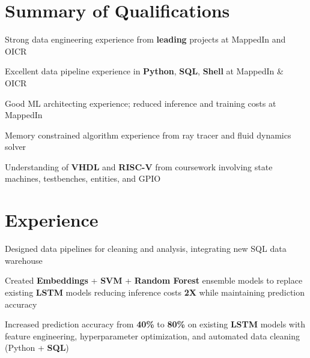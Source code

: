 \documentclass[]{chandan-cv}
\begin{document}
\hfill
\begin{minipage}[t]{0.75\textwidth}


\section{Summary of Qualifications}
\runsubsection{ }
\descript{ }
\location{ }
\vspace{\topsep} %
\begin{tightemize}
	\item Strong data engineering experience from \textbf{leading} projects at MappedIn and OICR
	\item Excellent data pipeline experience in \textbf{Python}, \textbf{SQL}, \textbf{Shell} at MappedIn \& OICR
	\item Good ML architecting experience; reduced inference and training costs at MappedIn
	\item Memory constrained algorithm experience from ray tracer and fluid dynamics solver
	\item Understanding of \textbf{VHDL} and \textbf{RISC-V} from coursework involving 
	state machines, testbenches, entities, and GPIO
\end{tightemize}
\sectionsep


\section{Experience}

\begin{tightemize}
        \item Designed data pipelines for cleaning and analysis, integrating new SQL data warehouse
		\item Created \textbf{Embeddings} + \textbf{SVM} + \textbf{Random Forest} ensemble models to replace existing 
		\textbf{LSTM} models reducing inference costs \textbf{2X} while maintaining prediction accuracy
		\item Increased prediction accuracy from \textbf{40\%} to \textbf{80\%} on existing \textbf{LSTM} 
		models with feature engineering, hyperparameter optimization, and automated data cleaning (Python + \textbf{SQL})
\end{tightemize}
\sectionsep


\end{minipage}
\end{document}
